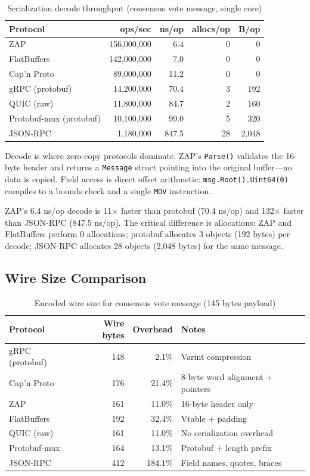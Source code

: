 \begin{table}[h]
\centering
\caption{Serialization decode throughput (consensus vote message, single core)}
\label{tab:decode}
\begin{tabular}{lrrrr}
\toprule
\textbf{Protocol} & \textbf{ops/sec} & \textbf{ns/op} & \textbf{allocs/op} & \textbf{B/op} \\
\midrule
\rowcolor{luxblue!10}
ZAP & 156,000,000 & 6.4 & 0 & 0 \\
FlatBuffers & 142,000,000 & 7.0 & 0 & 0 \\
Cap'n Proto & 89,000,000 & 11.2 & 0 & 0 \\
gRPC (protobuf) & 14,200,000 & 70.4 & 3 & 192 \\
QUIC (raw) & 11,800,000 & 84.7 & 2 & 160 \\
Protobuf-mux (protobuf) & 10,100,000 & 99.0 & 5 & 320 \\
JSON-RPC & 1,180,000 & 847.5 & 28 & 2,048 \\
\bottomrule
\end{tabular}
\end{table}

Decode is where zero-copy protocols dominate. ZAP's \texttt{Parse()} validates the 16-byte header and returns a \texttt{Message} struct pointing into the original buffer---no data is copied. Field access is direct offset arithmetic: \texttt{msg.Root().Uint64(0)} compiles to a bounds check and a single \texttt{MOV} instruction.

ZAP's 6.4 ns/op decode is 11$\times$ faster than protobuf (70.4 ns/op) and 132$\times$ faster than JSON-RPC (847.5 ns/op). The critical difference is allocations: ZAP and FlatBuffers perform 0 allocations; protobuf allocates 3 objects (192 bytes) per decode; JSON-RPC allocates 28 objects (2,048 bytes) for the same message.

\subsection{Wire Size Comparison}

\begin{table}[h]
\centering
\caption{Encoded wire size for consensus vote message (145 bytes payload)}
\label{tab:wiresize}
\begin{tabular}{lrrl}
\toprule
\textbf{Protocol} & \textbf{Wire bytes} & \textbf{Overhead} & \textbf{Notes} \\
\midrule
gRPC (protobuf) & 148 & 2.1\% & Varint compression \\
Cap'n Proto & 176 & 21.4\% & 8-byte word alignment + pointers \\
\rowcolor{luxblue!10}
ZAP & 161 & 11.0\% & 16-byte header only \\
FlatBuffers & 192 & 32.4\% & Vtable + padding \\
QUIC (raw) & 161 & 11.0\% & No serialization overhead \\
Protobuf-mux & 164 & 13.1\% & Protobuf + length prefix \\
JSON-RPC & 412 & 184.1\% & Field names, quotes, braces \\
\bottomrule
\end{tabular}
\end{table}

